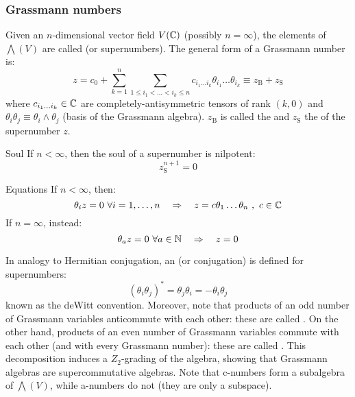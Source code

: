 \subsubsection{Grassmann numbers}

Given an $ n $-dimensional vector field $ V(\mathbb{C}) $ (possibly $ n = \infty $), the elements of $ \bigwedge(V) $ are called  (or supernumbers). The general form of a Grassmann number is:
\begin{equation}
  z = c_0 + \sum_{k = 1}^n \sum_{1 \le i_1 < \dots < i_k \le n} c_{i_1 \dots i_k} \theta_{i_1} \dots \theta_{i_k} \equiv z_\text{B} + z_\text{S}
\end{equation}
where $ c_{i_1 \dots i_k} \in \mathbb{C} $ are completely-antisymmetric tensors of rank $ (k,0) $ and $ \theta_i \theta_j \equiv \theta_i \wedge \theta_j $ (basis of the Grassmann algebra). $ z_\text{B} $ is called the  and $ z_\text{S} $ the  of the supernumber $ z $.

\begin{proposition}{Soul}{}
  If $ n < \infty $, then the soul of a supernumber is nilpotent:
  \begin{equation}
    z_\text{S}^{n+1} = 0
  \end{equation}
\end{proposition}

\begin{lemma}{Equations}{}
  If $ n < \infty $, then:
  \begin{equation}
    \theta_i z = 0 \,\,\forall i = 1,\dots,n
    \quad \Rightarrow \quad
    z = c \theta_1 \dots \theta_n \,\, , \,\, c \in \mathbb{C}
  \end{equation}
  If $ n = \infty $, instead:
  \begin{equation}
    \theta_a z = 0 \,\,\forall a \in \mathbb{N}
    \quad \Rightarrow \quad
    z = 0
  \end{equation}
\end{lemma}

In analogy to Hermitian conjugation, an  (or conjugation) is defined for supernumbers:
\begin{equation}
  (\theta_i \theta_j)^* = \theta_j \theta_i = - \theta_i \theta_j
\end{equation}
known as the deWitt convention. Moreover, note that products of an odd number of Grassmann variables anticommute with each other: these are called . On the other hand, products of an even number of Grassmann variables commute with each other (and with every Grassmann number): these are called . This decomposition induces a $ Z_2 $-grading of the algebra, showing that Grassmann algebras are supercommutative algebras\footnotemark. Note that c-numbers form a subalgebra of $ \bigwedge(V) $, while a-numbers do not (they are only a subspace).


